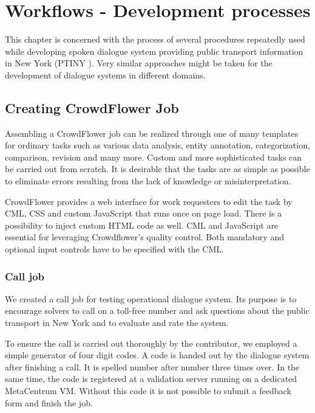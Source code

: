 \chapter{Workflows - Development processes} \label{ch:workflow}

This chapter is concerned with the process of several procedures repeatedly used while developing spoken dialogue system providing public transport information in New York (\ac{PTINY} ).
Very similar approaches might be taken for the development of dialogue systems in different domains.

\section{Creating CrowdFlower Job}

Assembling a CrowdFlower job can be realized through one of many templates for ordinary tasks such as various data analysis, entity annotation, categorization, comparison, revision and many more.%
Custom and more sophisticated tasks can be carried out from scratch.
It is desirable that the tasks are as simple as possible to eliminate errors resulting from the lack of knowledge or misinterpretation.

CrowdFlower provides a web interface for work requesters to edit the task by \acf{CML}, CSS and custom JavaScript that runs once on page load.
There is a possibility to inject custom HTML code as well.
CML and JavaScript are essential for leveraging Crowdflower's quality control.
Both mandatory and optional input controls have to be specified with the \ac{CML}.

\subsection{Call job}

We created a call job for testing operational dialogue system.
Its purpose is to encourage solvers to call on a toll-free number and ask questions about the public transport in New York and to evaluate and rate the system.

To ensure the call is carried out thoroughly by the contributor, we employed a simple generator of four digit codes.
A code is handed out by the dialogue system after finishing a call.
It is spelled number after number three times over.
In the same time, the code is registered at a validation server running on a dedicated MetaCentrum \ac{VM}.
Without this code it is not possible to submit a feedback form and finish the job.

